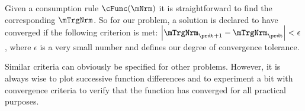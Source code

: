 \documentclass[SolvingMicroDSOPs]{subfiles}
\begin{document}
Given a consumption rule $\cFunc(\mNrm)$ it is straightforward to find
the corresponding $\mTrgNrm$.  So for our problem, a solution is declared
to have converged if the following criterion is met:
$\left|\mTrgNrm_{\prdt+1}-\mTrgNrm_{\prdt}\right| < \epsilon$, where $\epsilon$ is
a very small number and defines our degree of convergence tolerance.

Similar criteria can obviously be specified for other problems.
However, it is always wise to plot successive function differences and
to experiment a bit with convergence criteria to verify that the
function has converged for all practical purposes.

\end{document}

